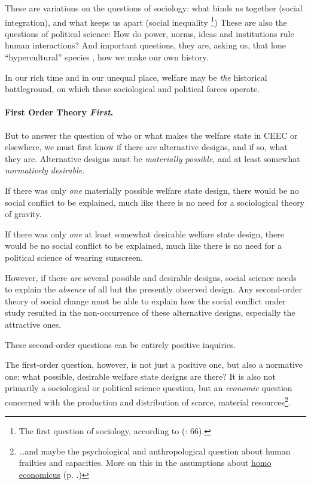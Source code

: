\documentclass[11pt,a4paper,oneside,openright]{article}
\begin{document}
These are variations on the questions of sociology: 
what binds us together (social integration), and what keeps us apart (social inequality
\footnote{
	The first question of sociology, according to \citeauthor{Dahrendorf1966} (\citeyear{Dahrendorf1966}: 66).
}) 
These are also the questions of political science: 
How do power, norms, ideas and institutions rule human interactions? 
And important questions, they are, asking us, that lone ``hypercultural'' species \citep{Henrich2004}, how we make our own history. 

In our rich time and in our unequal place, welfare may be \emph{the} historical battleground, on which these sociological and political forces operate. 

\paragraph{First Order Theory \emph{First}.}
But to answer the question of who or what makes the welfare state in \gls{CEEC} or elsewhere, we must first know if there are alternative designs, and if so, what they are. 
Alternative designs must be \emph{materially possible}, and at least somewhat \emph{normatively desirable}.

If there was only \emph{one} materially possible welfare state design, there would be no social conflict to be explained, much like there is no need for a sociological theory of gravity. 

If there was only \emph{one} at least somewhat desirable welfare state design, there would be no social conflict to be explained, much like there is no need for a political science of wearing sunscreen.

However, if there \emph{are} several possible and desirable designs, social science needs to explain the \emph{absence} of all but the presently observed design. 
Any second-order theory of social change must be able to explain how the social conflict under study resulted in the non-occurrence of these alternative designs, especially the attractive ones. 

These second-order questions can be entirely positive inquiries.

The first-order question, however, is not just a positive one, but also a normative one: 
what possible, desirable welfare state designs are there? 
It is also not primarily a sociological or political science question, but an \emph{economic} question concerned with the production and distribution of scarce, material resources\footnote
	{\ldots and maybe the psychological and anthropological question about human frailties and capacities. More on this in the assumptions about \hyperref[it:homo_economicus]{homo economicus} (p. \pageref{it:homo_economicus}.)}.
\end{document}

